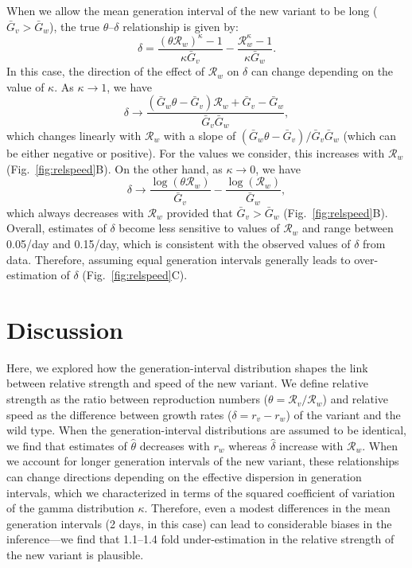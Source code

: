 \documentclass[12pt]{article}
\newcommand{\fref}[1]{Fig.~\ref{fig:#1}}
\newcommand{\RR}{\ensuremath{{\mathcal R}}\xspace}
\begin{document}
When we allow the mean generation interval of the new variant to be long ($\bar{G}_v > \bar{G}_w$), the true $\theta$--$\delta$ relationship is given by:
\begin{equation}
\delta = \frac{(\theta \RR_w)^{\kappa} - 1}{\kappa \bar{G}_v} - \frac{\RR_w^{\kappa} - 1}{\kappa \bar{G}_w}.
\end{equation}
In this case, the direction of the effect of $\RR_w$ on $\delta$ can change depending on the value of $\kappa$.
As $\kappa \to 1$, we have
\begin{equation}
\delta \to \frac{(\bar{G}_w \theta - \bar{G}_v) \RR_w + \bar{G}_v - \bar{G}_w}{\bar{G}_v \bar{G}_w},
\end{equation}
which changes linearly with $\RR_w$ with a slope of $(\bar{G}_w \theta - \bar{G}_v)/\bar{G}_v \bar{G}_w$ (which can be either negative or positive).
For the values we consider, this increases with $\RR_w$ (\fref{relspeed}B).
On the other hand, as $\kappa \to 0$, we have
\begin{equation}
\delta \to \frac{\log(\theta \RR_w)}{\bar{G}_v} - \frac{\log(\RR_w)}{\bar{G}_w},
\end{equation}
which always decreases with $\RR_w$ provided that $\bar{G}_v > \bar{G}_w$ (\fref{relspeed}B).
Overall, estimates of $\delta$ become less sensitive to values of $\RR_w$ and range between 0.05/day and 0.15/day, which is consistent with the observed values of $\delta$ from data.
Therefore, assuming equal generation intervals generally leads to over-estimation of $\delta$ (\fref{relspeed}C).

\section{Discussion}

Here, we explored how the generation-interval distribution shapes the link between relative strength and speed of the new variant.
We define relative strength as the ratio between reproduction numbers ($\theta=\RR_v/\RR_w$) and relative speed as the difference between growth rates ($\delta=r_v-r_w$) of the variant and the wild type.
When the generation-interval distributions are assumed to be identical, we find that estimates of $\hat{\theta}$ decreases with $r_w$ whereas $\hat{\delta}$ increase with $\RR_w$.
When we account for longer generation intervals of the new variant, these relationships can change directions depending on the effective dispersion in generation intervals, which we characterized in terms of the squared coefficient of variation of the gamma distribution $\kappa$.
Therefore, even a modest differences in the mean generation intervals (2 days, in this case) can lead to considerable biases in the inference---we find that 1.1--1.4 fold under-estimation in the relative strength of the new variant is plausible.
\end{document}
